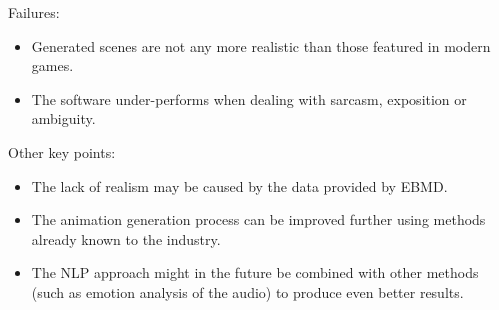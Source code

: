 \noindent Failures:
\begin{itemize}
	\item Generated scenes are not any more realistic than those featured in modern games.
	\item The software under-performs when dealing with sarcasm, exposition or ambiguity.
\end{itemize}

\noindent Other key points:
\begin{itemize}
	\item The lack of realism may be caused by the data provided by EBMD.
	\item The animation generation process can be improved further using methods already known to the industry.
	\item The NLP approach might in the future be combined with other methods (such as emotion analysis of the audio) to produce even better results.
\end{itemize}




